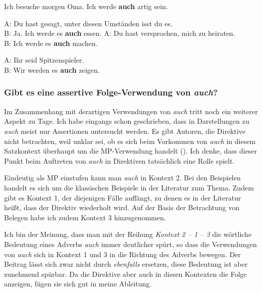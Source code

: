 \begin{exe}
	\ex\label{1139} 
	Ich besuche morgen Oma. Ich werde \textbf{auch} artig sein.
\end{exe}

\begin{exe}
	\ex\label{1140} 
		\begin{xlist}
			\ex\label{1140a} 
				A: Du hast gesagt, unter diesen Umständen isst du es.\\
				B: Ja. Ich werde es \textbf{auch} essen.
			\ex\label{1140b} 
				A: Du hast versprochen, mich zu heiraten.\\
				B: Ich werde es \textbf{auch} machen.
		\end{xlist}
\end{exe}	

\begin{exe}
	\ex\label{1141} 
	A: Ihr seid Spitzenspieler.\\
	B: Wir werden es \textbf{auch} zeigen.
\end{exe}	
	
\subsubsection{Gibt es eine assertive Folge-Verwendung von \textit{auch}?}
Im Zusammenhang mit derartigen Verwendungen von \textit{auch} tritt noch ein weiterer Aspekt zu Tage. Ich habe eingangs schon geschrieben, dass in Darstellungen zu \textit{auch} meist nur Assertionen untersucht werden. Es gibt Autoren, die Direktive nicht betrachten, weil unklar sei, ob es sich beim Vorkommen von \textit{auch} in diesem Satzkontext überhaupt um die MP-Verwendung handelt (\citealt[222]{Karagjosova2004}). Ich denke, dass dieser Punkt beim Auftreten von \textit{auch} in Direktiven tatsächlich eine Rolle spielt.

Eindeutig als MP einstufen kann man \textit{auch} in Kontext 2. Bei den Beispielen handelt es sich um die klassischen Beispiele in der Literatur zum Thema. Zudem gibt es Kontext 1, der diejenigen Fälle auffängt, zu denen es in der Literatur heißt, dass der Direktiv wiederholt wird. Auf der Basis der Betrachtung von Belegen habe ich zudem Kontext 3 hinzugenommen.

Ich bin der Meinung, dass man mit der Reihung \textit{Kontext 2 – 1 – 3} die wörtliche Bedeutung eines Adverbs \textit{auch} immer deutlicher spürt, so dass die Verwendungen von \textit{auch} sich in Kontext 1 und 3 in die Richtung des Adverbs bewegen. Der Beitrag lässt sich zwar nicht durch \textit{ebenfalls} ersetzen, diese Bedeutung ist aber zunehmend spürbar. Da die Direktive aber auch in diesen Kontexten die Folge anzeigen, fügen sie sich gut in meine Ableitung.

